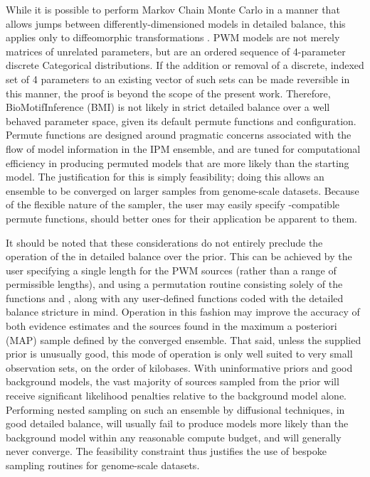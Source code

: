 While it is possible to perform Markov Chain Monte Carlo in a manner that allows jumps between differently-dimensioned models in detailed balance, this applies only to diffeomorphic transformations \cite{Hastie2012}. PWM models are not merely matrices of unrelated parameters, but are an ordered sequence of 4-parameter discrete Categorical distributions. If the addition or removal of a discrete, indexed set of 4 parameters to an existing vector of such sets can be made reversible in this manner, the proof is beyond the scope of the present work. Therefore, BioMotifInference (BMI) is not likely in strict detailed balance over a well behaved parameter space, given its default permute functions and configuration. Permute functions are designed around pragmatic concerns associated with the flow of model information in the IPM ensemble, and are tuned for computational efficiency in producing permuted models that are more likely than the starting model. The justification for this is simply feasibility; doing this allows an ensemble to be converged on larger samples from genome-scale datasets. Because of the flexible nature of the sampler, the user may easily specify -compatible permute functions, should better ones for their application be apparent to them.

It should be noted that these considerations do not entirely preclude the operation of the  in detailed balance over the prior. This can be achieved by the user specifying a single length for the PWM sources (rather than a range of permissible lengths), and using a permutation routine consisting solely of the functions  and , along with any user-defined functions coded with the detailed balance stricture in mind. Operation in this fashion may improve the accuracy of both evidence estimates and the sources found in the maximum a posteriori (MAP) sample defined by the converged ensemble. That said, unless the supplied prior is unusually good, this mode of operation is only well suited to very small observation sets, on the order of kilobases. With uninformative priors and good background models, the vast majority of sources sampled from the prior will receive significant likelihood penalties relative to the background model alone. Performing nested sampling on such an ensemble by diffusional techniques, in good detailed balance, will usually fail to produce models more likely than the background model within any reasonable compute budget, and will generally never converge. The feasibility constraint thus justifies the use of bespoke sampling routines for genome-scale datasets.

